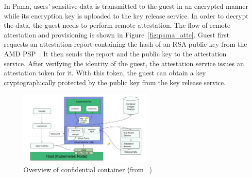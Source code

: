In Pama, users' sensitive data is transmitted to the guest in an encrypted manner while its encryption key is uploaded to the key release service. In order to decrypt the data, the guest needs to perform remote attestation. The flow of remote attestation and provisioning 
is shown in Figure~\ref{fig:pama_atte}. Guest first requests an attestation report containing the hash of an RSA public key from the AMD PSP~\cite*{snp_firmware}. It then sends the report and the public key to the attestation service. After verifying the identity of the guest, 
the attestation service issues an attestation token for it. With this token, the guest can obtain a key cryptographically protected by the public key from the key release service.

 
\begin{figure}[htp]
    \centering
    \includegraphics[width=0.6\textwidth]{images/confidentail_kata.png}
    \caption[Overview of confidential container]{Overview of confidential container (from ~\cite*{confidential_kata})}
    \label{fig:confidentail_kata}
\end{figure}

